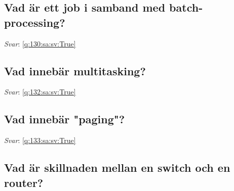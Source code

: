 \documentclass[a4paper,11pt,oneside]{article}
\begin{document}
\begin{sloppypar}
\subsection{Vad \"ar ett job i samband med batch-processing?}

\label{q:130:sa:sv:False}

\vspace{2cm}

\noindent\makebox[\textwidth]{\hrulefill}

\vspace{1cm}

\textit{Svar}: \autoref{q:130:sa:sv:True}



\subsection{Vad inneb\"ar multitasking?}

\label{q:132:sa:sv:False}

\vspace{2cm}

\noindent\makebox[\textwidth]{\hrulefill}

\vspace{1cm}

\textit{Svar}: \autoref{q:132:sa:sv:True}



\subsection{Vad inneb\"ar "paging"?}

\label{q:133:sa:sv:False}

\vspace{2cm}

\noindent\makebox[\textwidth]{\hrulefill}

\vspace{1cm}

\textit{Svar}: \autoref{q:133:sa:sv:True}



\subsection{Vad \"ar skillnaden mellan en switch och en router?}

\label{q:134:sa:sv:False}

\vspace{2cm}

\noindent\makebox[\textwidth]{\hrulefill}


\end{sloppypar}
\end{document}
